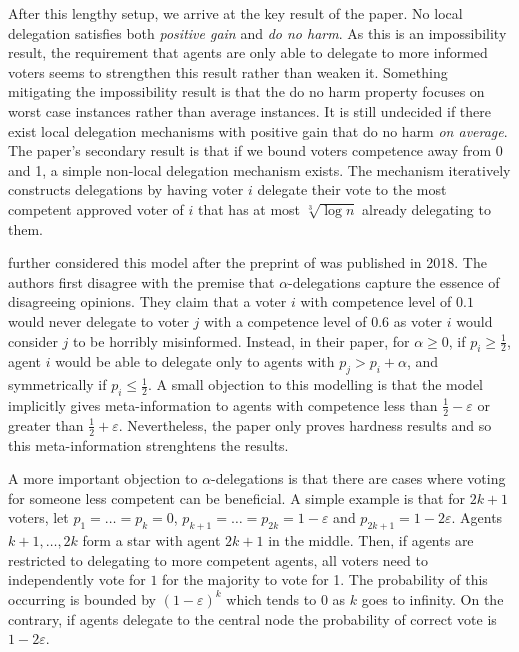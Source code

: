 \documentclass[11pt,a4paper, titlepage]{article}
\theoremstyle{definition}
\begin{document}
After this lengthy setup, we arrive at the key result of the paper. No local delegation satisfies both \emph{positive gain} and \emph{do no harm}.
As this is an impossibility result, the requirement that agents are only able to delegate to more informed voters seems to strengthen this result rather than weaken it.
Something mitigating the impossibility result is that the do no harm property focuses on worst case instances rather than average instances.
It is still undecided if there exist local delegation mechanisms with positive gain that do no harm \emph{on average}.
The paper's secondary result is that if we bound voters competence away from 0 and 1, a simple non-local delegation mechanism exists.
The mechanism iteratively constructs delegations by having voter $i$ delegate their vote to the most competent approved voter of $i$ that has at most $\sqrt[3]{\log n}$ already delegating to them.



\citet{caragiannis2019contribution} further considered this model after the preprint of \citet{kahng2021liquid} was published in 2018.
The authors first disagree with the premise that $\alpha$-delegations capture the essence of disagreeing opinions.
They claim that a voter $i$ with competence level of $0.1$ would never delegate to voter $j$ with a competence level of $0.6$ as voter $i$ would consider $j$ to be horribly misinformed.
Instead, in their paper, for $\alpha \geq 0$, if $p_i \geq \frac{1}{2}$, agent $i$ would be able to delegate only to agents with $p_j > p_i + \alpha$, and symmetrically if $p_i \leq \frac{1}{2}$.
A small objection to this modelling is that the model implicitly gives meta-information to agents with competence less than $\frac{1}{2} - \varepsilon$ or greater than $\frac{1}{2} + \varepsilon$. Nevertheless, the paper only proves hardness results and so this meta-information strenghtens the results.

A more important objection to $\alpha$-delegations is that there are cases where voting for someone less competent can be beneficial.
A simple example is that for $2k + 1$ voters, let $p_1 = \ldots = p_k = 0$, $p_{k+1} = \ldots = p_{2k} = 1 - \varepsilon$ and $p_{2k+1} = 1 - 2\varepsilon$.
Agents $k+1, \ldots, 2k$ form a star with agent $2k+1$ in the middle.
Then, if agents are restricted to delegating to more competent agents, all voters need to independently vote for $1$ for the majority to vote for 1.
The probability of this occurring is bounded by $(1 - \varepsilon)^k$ which tends to 0 as $k$ goes to infinity.
On the contrary, if agents delegate to the central node the probability of correct vote is $1 - 2\varepsilon$.
\end{document}
